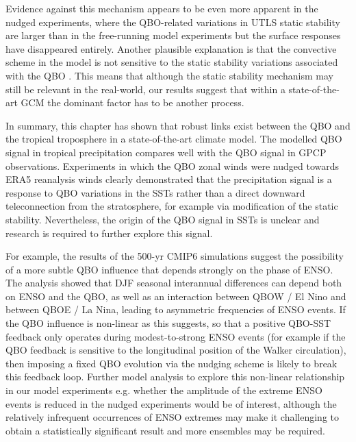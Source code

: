 Evidence against this mechanism appears to be even more apparent in the nudged experiments, where the QBO-related variations in UTLS static stability are larger than in the free-running model experiments but the surface responses have disappeared entirely. 
Another plausible explanation is that the convective scheme in the model is not sensitive to the static stability variations associated with the QBO \citep{yamazaki2020tropospheric}. This means that although the static stability mechanism may still be relevant in the real-world, our results suggest that within a state-of-the-art GCM the dominant factor has to be another process.

In summary, this chapter has shown that robust links exist between the QBO and the 
tropical troposphere in a state-of-the-art climate model. The modelled QBO signal in tropical precipitation compares well with the QBO signal in GPCP observations. Experiments in which the QBO zonal winds were nudged towards ERA5 reanalysis winds clearly demonstrated that the precipitation signal is a response to QBO variations in the SSTs rather than a direct downward teleconnection from the stratosphere, for example via modification of the static stability. Nevertheless, the origin of the QBO signal in SSTs is unclear and research is required to further explore this signal.


For example, the results of the 500-yr CMIP6 simulations suggest the possibility of a more subtle QBO influence that depends strongly on the phase of ENSO. The analysis showed that DJF seasonal interannual differences can depend both on ENSO and the QBO, as well as an interaction between QBOW / El Nino and between QBOE / La Nina, leading to asymmetric frequencies of ENSO events.
 If the QBO influence is non-linear as this suggests, so that a positive QBO-SST feedback only operates during modest-to-strong ENSO events (for example if the QBO feedback is sensitive to the longitudinal position of the Walker circulation), then imposing a fixed QBO evolution via the nudging scheme is likely to break this feedback loop. Further model analysis to explore this non-linear relationship in our model experiments e.g. whether the amplitude of the extreme ENSO events is reduced in the nudged experiments would be of interest, although the relatively infrequent occurrences of ENSO extremes may make it challenging to obtain a statistically significant result and more ensembles may be required.    

